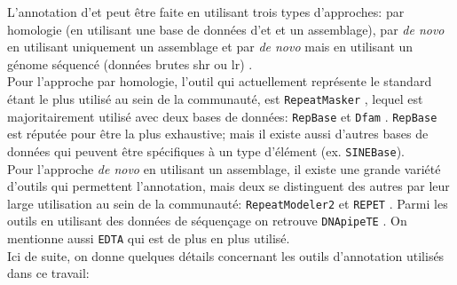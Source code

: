 \documentclass[10pt]{article}
\begin{document}
L'annotation d'\acrshort{et} peut être faite en utilisant trois types d'approches: par homologie (en utilisant une base de données d'\acrshort{et} et un assemblage), par \textit{de novo} en utilisant uniquement un assemblage et par \textit{de novo} mais en utilisant un génome séquencé (données brutes \acrfull{shr} ou \acrfull{lr}) \cite{goerner-potvin_computational_2018}. \\
Pour l'approche par homologie, l'outil qui actuellement représente le standard étant le plus utilisé au sein de la communauté, est \texttt{RepeatMasker} \cite{noauthor_repeatmasker_nodate}, lequel est majoritairement utilisé avec deux bases de données: \texttt{RepBase} \cite{jurka_repbase_2005} et \texttt{Dfam} \cite{storer_dfam_2021}. \texttt{RepBase} est réputée pour être la plus exhaustive; mais il existe aussi d'autres bases de données qui peuvent être spécifiques à un type d'élément (ex. \texttt{SINEBase}). \\ 


Pour l'approche \textit{de novo} en utilisant un assemblage, il existe une grande variété d'outils qui permettent l'annotation, mais deux se distinguent des autres par leur large utilisation au sein de la communauté: \texttt{RepeatModeler2} \cite{flynn_repeatmodeler2_2019} et \texttt{REPET} \cite{flutre_considering_2011}. Parmi les outils en utilisant des données de séquençage on retrouve \texttt{DNApipeTE} \cite{goubert_novo_2015}. On mentionne aussi \texttt{EDTA} \cite{ou_benchmarking_2019} qui est de plus en plus utilisé. \\
Ici de suite, on donne quelques détails concernant les outils d'annotation utilisés dans ce travail:
\end{document}
